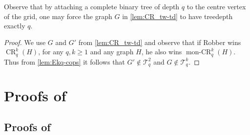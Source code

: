 \documentclass[a4paper,UKenglish,cleveref, autoref, thm-restate]{lipics-v2021}
\newcommand{\Ekq}{\ensuremath{\mathcal{T}_{q}^{k}}}
\newcommand{\EParam}[2]{\ensuremath{\mathcal{T}_{#2}^{#1}}}
\DeclareMathOperator{\CR}{CR}
\DeclareMathOperator{\monCR}{mon-CR}
\begin{document}
Observe that by attaching a complete binary tree of depth $q$ to the centre vertex of the grid, one may force the graph $G$ in \cref{lem:CR_tw-td} to have treedepth exactly $q$.


\ekqtwtdsyntax*

\begin{proof}
	We use $G$ and $G'$ from \cref{lem:CR_tw-td} and observe that if Robber wins $\CR_q^k({H})$, for any $q,k\geq 1$ and any graph $H$, he also wins $\monCR_q^k(H)$.
	Thus from \cref{lem:Ekq-cops} it follows that $G'\notin\EParam{2}{q}$ and $G\notin\Ekq$.
\end{proof} 
\section{Proofs of }
\label{app:homind}
\subsection{Proofs of }
\label{app:c-homind}

\homcountsInCkq*
\end{document}
